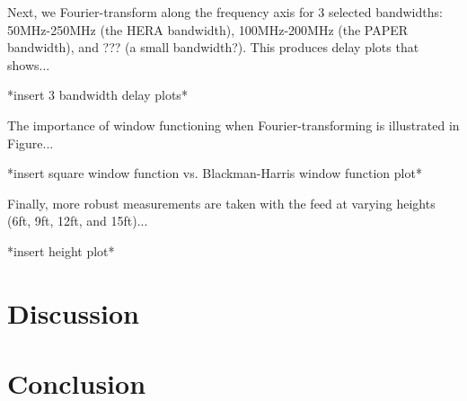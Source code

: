\documentclass[12pt,preprint]{aastex}
\begin{document}
Next, we Fourier-transform along the frequency axis for 3 selected bandwidths: 50MHz-250MHz (the HERA bandwidth), 100MHz-200MHz (the PAPER bandwidth), and ??? (a small bandwidth?). This produces delay plots that shows...

*insert 3 bandwidth delay plots*

The importance of window functioning when Fourier-transforming is illustrated in Figure...

*insert square window function vs. Blackman-Harris window function plot*

Finally, more robust measurements are taken with the feed at varying heights (6ft, 9ft, 12ft, and 15ft)...

*insert height plot*


\section{Discussion}

\section{Conclusion}
\end{document}
